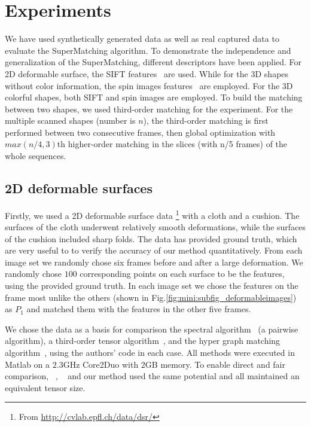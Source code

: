 \section{Experiments}
\label{sec:experiments}

We have used synthetically generated data as well as real captured data to evaluate the SuperMatching algorithm.
To demonstrate the independence and generalization of the SuperMatching, different descriptors have been applied.
For 2D deformable surface, the SIFT features~\cite{Lowe04} are used.
While for the 3D shapes without color information, the spin images features~\cite{Johnson99} are employed.
For the 3D colorful shapes, both SIFT and spin images are employed.
To build the matching between two shapes, we used third-order matching for the experiment.
For the multiple scanned shapes (number is $n$), 
the third-order matching is first performed between two consecutive frames, 
then global optimization with $max(n/4,3)$th higher-order matching in the slices (with n/5 frames) of the whole sequences.

\subsection{2D deformable surfaces}
\label{subsec:2ddeformabledata}

Firstly, we used a 2D deformable surface data \footnote{From \url{http://cvlab.epfl.ch/data/dsr/}} with a cloth and a cushion.
The surfaces of the cloth underwent relatively smooth deformations, while the surfaces of the cushion included sharp folds.
The data has provided ground truth, which are very useful to to verify the accuracy of our method quantitatively.
From each image set we randomly chose six frames before and after a large deformation. 
We randomly chose $100$ corresponding points on each surface to be the features, using the provided ground truth.
In each image set we chose the features on the frame most unlike the others  (shown in Fig.\ref{fig:mini:subfig_deformableimages}) 
as $P_1$ and matched them with the features in the other five frames.

We chose the data as a basis for comparison the spectral algorithm~\cite{Cour06} (a pairwise algorithm),
a third-order tensor algorithm~\cite{Duchenne09},
and the hyper graph matching algorithm~\cite{Zass08}, using the authors' code in each case.
All methods were executed in Matlab on a $2.3$GHz Core2Duo with $2$GB memory.
To enable direct and fair comparison, 
~\cite{Duchenne09}, ~\cite{Zass08} and our method used the same potential and all maintained an equivalent tensor size.

